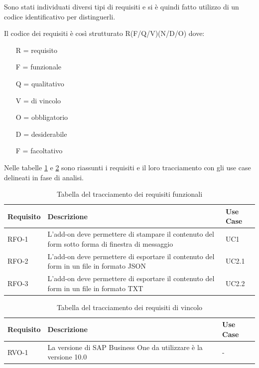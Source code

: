 Sono stati individuati diversi tipi di requisiti e si è quindi fatto utilizzo di un codice identificativo per distinguerli.

Il codice dei requisiti è così strutturato R(F/Q/V)(N/D/O) dove:
\begin{enumerate}
	\item[R =] requisito
	\item[F =] funzionale
	\item[Q =] qualitativo
	\item[V =] di vincolo
	\item[O =] obbligatorio
	\item[D =] desiderabile
	\item[F =] facoltativo
\end{enumerate}
Nelle tabelle \ref{tab:requisiti-funzionali} e \ref{tab:requisiti-vincolo} sono riassunti i requisiti e il loro tracciamento con gli use case delineati in fase di analisi.


\begin{table}[!h]%
	\begin{tabularx}{\textwidth}{lXl}
		\hline\hline
		\textbf{Requisito} & \textbf{Descrizione} & \textbf{Use Case}\\
		\hline
		RFO-1     & L'add-on deve permettere di stampare il contenuto del form sotto forma di finestra di messaggio & UC1 \\
		RFO-2     & L'add-on deve permettere di esportare il contenuto del form in un file in formato JSON & UC2.1\\
		RFO-3     & L'add-on deve permettere di esportare il contenuto del form in un file in formato TXT & UC2.2\\
		\hline
	\end{tabularx}
	\caption{Tabella del tracciamento dei requisiti funzionali}
	\label{tab:requisiti-funzionali}
\end{table}%

\begin{table}[!h]%
	\begin{tabularx}{\textwidth}{lXl}
		\hline\hline
		\textbf{Requisito} & \textbf{Descrizione} & \textbf{Use Case}\\
		\hline
		RVO-1    & La versione di SAP Business One da utilizzare è la versione 10.0 & - \\
		\hline
	\end{tabularx}
	\caption{Tabella del tracciamento dei requisiti di vincolo}
	\label{tab:requisiti-vincolo}
\end{table}%

